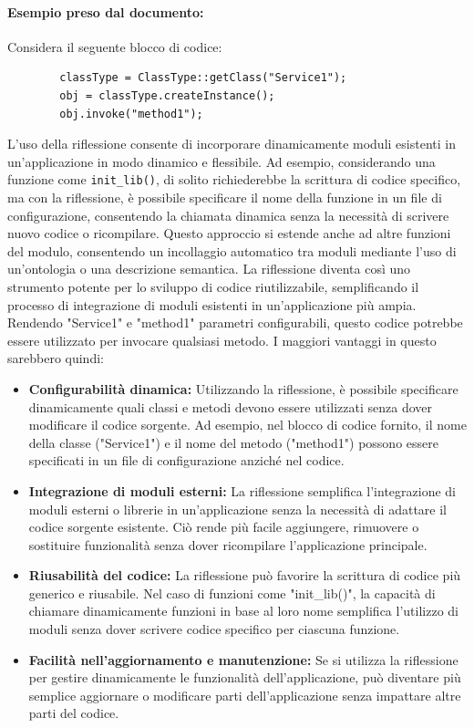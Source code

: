 \documentclass[11pt]{article}
\begin{document}
\begin{multicols*}{2}[\columnsep=1cm]
    \paragraph{Esempio preso dal documento:}
    Considera il seguente blocco di codice:
    \begin{lstlisting}
        classType = ClassType::getClass("Service1");
        obj = classType.createInstance();
        obj.invoke("method1");
    \end{lstlisting}

    L'uso della riflessione consente di incorporare dinamicamente moduli esistenti in un'applicazione in modo dinamico e flessibile. Ad esempio, considerando una funzione come \texttt{init\_lib()}, di solito richiederebbe la scrittura di codice specifico, ma con la riflessione, è possibile specificare il nome della funzione in un file di configurazione, consentendo la chiamata dinamica senza la necessità di scrivere nuovo codice o ricompilare. Questo approccio si estende anche ad altre funzioni del modulo, consentendo un incollaggio automatico tra moduli mediante l'uso di un'ontologia o una descrizione semantica. La riflessione diventa così uno strumento potente per lo sviluppo di codice riutilizzabile, semplificando il processo di integrazione di moduli esistenti in un'applicazione più ampia. Rendendo "Service1" e "method1" parametri configurabili, questo codice potrebbe essere utilizzato per invocare qualsiasi metodo.
    I maggiori vantaggi in questo sarebbero quindi:
    \begin{itemize}
        \item \textbf{Configurabilità dinamica:} Utilizzando la riflessione, è possibile specificare dinamicamente quali classi e metodi devono essere utilizzati senza dover modificare il codice sorgente. Ad esempio, nel blocco di codice fornito, il nome della classe ("Service1") e il nome del metodo ("method1") possono essere specificati in un file di configurazione anziché nel codice.
        \item \textbf{Integrazione di moduli esterni:} La riflessione semplifica l'integrazione di moduli esterni o librerie in un'applicazione senza la necessità di adattare il codice sorgente esistente. Ciò rende più facile aggiungere, rimuovere o sostituire funzionalità senza dover ricompilare l'applicazione principale.
        \item \textbf{Riusabilità del codice:} La riflessione può favorire la scrittura di codice più generico e riusabile. Nel caso di funzioni come "init\_lib()", la capacità di chiamare dinamicamente funzioni in base al loro nome semplifica l'utilizzo di moduli senza dover scrivere codice specifico per ciascuna funzione.
        \item \textbf{Facilità nell'aggiornamento e manutenzione:} Se si utilizza la riflessione per gestire dinamicamente le funzionalità dell'applicazione, può diventare più semplice aggiornare o modificare parti dell'applicazione senza impattare altre parti del codice.
    \end{itemize}

\end{multicols*}
\end{document}
